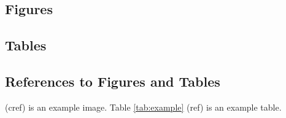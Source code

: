 \subsection{Figures}


\subsection{Tables}


\subsection{References to Figures and Tables}
 (cref) is an example image. Table \ref{tab:example} (ref) is an example table. 
